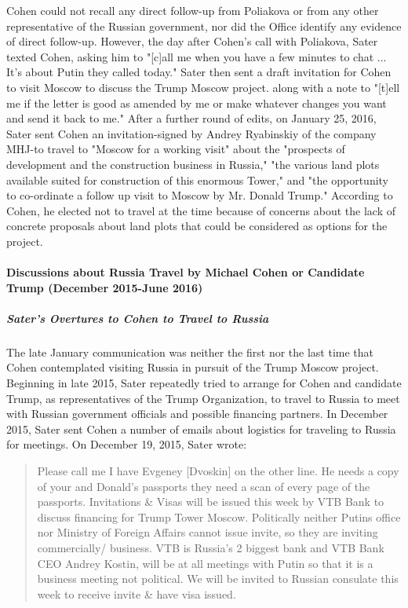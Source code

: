 Cohen could not recall any direct follow-up from Poliakova or from any other representative of the Russian government, nor did the Office identify any evidence of direct follow-up.
However, the day after Cohen's call with Poliakova, Sater texted Cohen, asking him to "[c]all me when you have a few minutes to chat ... It's about Putin they called today."%
Sater then sent a draft invitation for Cohen to visit Moscow to discuss the Trump Moscow project.%
along with a note to "[t]ell me if the letter is good as amended by me or make whatever changes you want and send it back to me."%
After a further round of edits, on January 25, 2016, Sater sent Cohen an invitation-signed by Andrey Ryabinskiy of the company MHJ-to travel to "Moscow for a working visit" about the "prospects of development and the construction business in Russia," "the various land plots available suited for construction of this enormous Tower," and "the opportunity to co-ordinate a follow up visit to Moscow by Mr. Donald Trump."%
According to Cohen, he elected not to travel at the time because of concerns about the lack of concrete proposals about land plots that could be considered as options for the project.%

\paragraph{Discussions about Russia Travel by Michael Cohen or Candidate Trump (December 2015-June 2016)}

\subparagraph{Sater's Overtures to Cohen to Travel to Russia}

The late January communication was neither the first nor the last time that Cohen contemplated visiting Russia in pursuit of the Trump Moscow project.
Beginning in late 2015, Sater repeatedly tried to arrange for Cohen and candidate Trump, as representatives of the Trump Organization, to travel to Russia to meet with Russian government officials and possible financing partners.
In December 2015, Sater sent Cohen a number of emails about logistics for traveling to Russia for meetings.%
On December 19, 2015, Sater wrote:

\begin{quote}
Please call me I have Evgeney [Dvoskin] on the other line.%
He needs a copy of your and Donald's passports they need a scan of every page of the passports.
Invitations & Visas will be issued this week by VTB Bank to discuss financing for Trump Tower Moscow. Politically neither Putins office nor Ministry of Foreign Affairs cannot issue invite, so they are inviting commercially/ business.
VTB is Russia's 2 biggest bank and VTB Bank CEO Andrey Kostin, will be at all meetings with Putin so that it is a business meeting not political.
We will be invited to Russian consulate this week to receive invite & have visa issued.%
\end{quote}

